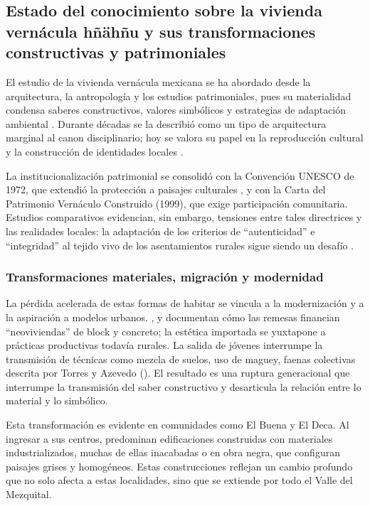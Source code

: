 \subsection{Estado del conocimiento sobre la vivienda vernácula hñähñu y sus transformaciones constructivas y patrimoniales}

El estudio de la vivienda vernácula mexicana se ha abordado desde la arquitectura, la antropología y los estudios patrimoniales, pues su materialidad condensa saberes constructivos, valores simbólicos y estrategias de adaptación ambiental \cite{rudofsky1964, zarate2009arquitectura}.  Durante décadas se la describió como un tipo de arquitectura marginal al canon disciplinario; hoy se valora su papel en la reproducción cultural y la construcción de identidades locales \cite{gonzalez2017arquitectura, icomos1999carta}.

La institucionalización patrimonial se consolidó con la Convención UNESCO de 1972, que extendió la protección a paisajes culturales \cite{UNESCO1972}, y con la Carta del Patrimonio Vernáculo Construido (1999), que exige participación comunitaria.  Estudios comparativos evidencian, sin embargo, tensiones entre tales directrices y las realidades locales: la adaptación de los criterios de ``autenticidad'' e ``integridad'' al tejido vivo de los asentamientos rurales sigue siendo un desafío \cite{venecia1964card, icomos1999carta, prats1998concepto}.

\subsubsection{Transformaciones materiales, migración y modernidad}

La pérdida acelerada de estas formas de habitar se vincula a la modernización y a la aspiración a modelos urbanos. \cite{alvarez2003maguey}, \cite{juarez2018transformacion} y \cite{boils2010remesas} documentan cómo las remesas financian ``neoviviendas'' de block y concreto; la estética importada se yuxtapone a prácticas productivas todavía rurales.  La salida de jóvenes interrumpe la transmisión de técnicas como mezcla de suelos, uso de maguey, faenas colectivas descrita por Torres y Azevedo (\citeyear{torres2021transmision}).  El resultado es una ruptura generacional que interrumpe la transmisión del saber constructivo y desarticula la relación entre lo material y lo simbólico.

Esta transformación es evidente en comunidades como El Buena y El Deca. Al ingresar a sus centros, predominan edificaciones construidas con materiales industrializados, muchas de ellas inacabadas o en obra negra, que configuran paisajes grises y homogéneos. Estas construcciones reflejan un cambio profundo que no solo afecta a estas localidades, sino que se extiende por todo el Valle del Mezquital.

